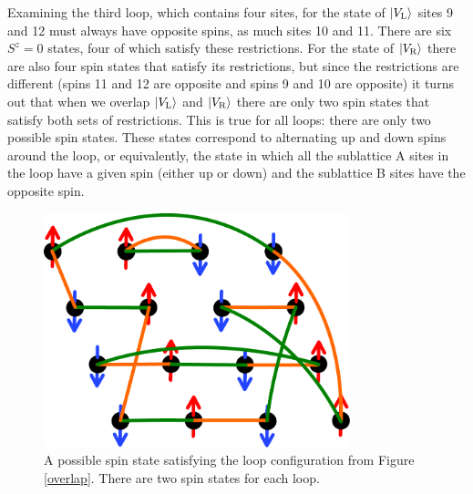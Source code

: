 Examining the third loop, which contains four sites, for the state of $\lvert {V_\text{L}} \rangle$ sites 9 and 12 must always have opposite spins, as much sites 10 and 11.  There are six $S^z=0$ states, four of which satisfy these restrictions.  For the state of $\lvert {V_\text{R}} \rangle$ there are also four spin states that satisfy its restrictions, but since the restrictions are different (spins 11 and 12 are opposite and spins 9 and 10 are opposite) it turns out that when we overlap $\lvert {V_\text{L}} \rangle$ and $\lvert {V_\text{R}} \rangle$ there are only two spin states that satisfy both sets of restrictions.  This is true for all loops: there are only two possible spin states.  These states correspond to alternating up and down spins around the loop, or equivalently, the state in which all the sublattice A sites in the loop have a given spin (either up or down) and the sublattice B sites have the opposite spin.  

\begin{figure} { \includegraphics [width=3.5in]
{./figures/made/spinstate.pdf}
\centering
 \caption[A possible spin state]{
	A possible spin state satisfying the loop configuration from Figure \ref{overlap}.  There are two  spin states for each loop. }
\label{spinstate}
}
\end{figure}

